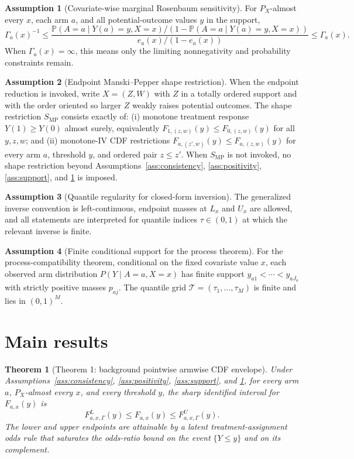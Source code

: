 \documentclass[11pt]{article}
\renewcommand{\Pr}{\mathbb{P}}
\theoremstyle{definition}
\newtheorem{assumption}{Assumption}
\theoremstyle{plain}
\newtheorem{theorem}{Theorem}
\theoremstyle{remark}
\begin{document}
\begin{assumption}[Covariate-wise marginal Rosenbaum sensitivity]\label{ass:msm}
For \(P_X\)-almost every \(x\), each arm \(a\), and all potential-outcome values \(y\) in the support,
\[
\Gamma_a(x)^{-1}
\le
\frac{\Pr(A=a\mid Y(a)=y,X=x)/(1-\Pr(A=a\mid Y(a)=y,X=x))}
     {e_a(x)/(1-e_a(x))}
\le
\Gamma_a(x).
\]
When \(\Gamma_a(x)=\infty\), this means only the limiting nonnegativity and probability constraints remain.
\end{assumption}

\begin{assumption}[Endpoint Manski--Pepper shape restriction]\label{ass:mp}
When the endpoint reduction is invoked, write \(X=(Z,W)\) with \(Z\) in a totally ordered support and with the order oriented so larger \(Z\) weakly raises potential outcomes.  The shape restriction \(S_{\mathrm{MP}}\) consists exactly of: (i) monotone treatment response \(Y(1)\ge Y(0)\) almost surely, equivalently \(F_{1,(z,w)}(y)\le F_{0,(z,w)}(y)\) for all \(y,z,w\); and (ii) monotone-IV CDF restrictions \(F_{a,(z',w)}(y)\le F_{a,(z,w)}(y)\) for every arm \(a\), threshold \(y\), and ordered pair \(z\le z'\).  When \(S_{\mathrm{MP}}\) is not invoked, no shape restriction beyond Assumptions~\ref{ass:consistency}, \ref{ass:positivity}, \ref{ass:support}, and \ref{ass:msm} is imposed.
\end{assumption}

\begin{assumption}[Quantile regularity for closed-form inversion]\label{ass:quantile}
The generalized inverse convention is left-continuous, endpoint masses at \(L_x\) and \(U_x\) are allowed, and all statements are interpreted for quantile indices \(\tau\in(0,1)\) at which the relevant inverse is finite.
\end{assumption}

\begin{assumption}[Finite conditional support for the process theorem]\label{ass:finite}
For the process-compatibility theorem, conditional on the fixed covariate value \(x\), each observed arm distribution \(P(Y\mid A=a,X=x)\) has finite support \(y_{a1}<\cdots<y_{aJ_a}\) with strictly positive masses \(p_{aj}\).  The quantile grid \(\mathcal{T}=(\tau_1,\ldots,\tau_M)\) is finite and lies in \((0,1)^M\).
\end{assumption}

\section{Main results}
\begin{theorem}[Theorem 1: background pointwise armwise CDF envelope]\label{thm:cdf-envelope}
Under Assumptions~\ref{ass:consistency}, \ref{ass:positivity}, \ref{ass:support}, and \ref{ass:msm}, for every arm \(a\), \(P_X\)-almost every \(x\), and every threshold \(y\), the sharp identified interval for \(F_{a,x}(y)\) is
\[
F^L_{a,x,\Gamma}(y)\le F_{a,x}(y)\le F^U_{a,x,\Gamma}(y).
\]
The lower and upper endpoints are attainable by a latent treatment-assignment odds rule that saturates the odds-ratio bound on the event \(\{Y\le y\}\) and on its complement.
\end{theorem}
\end{document}
